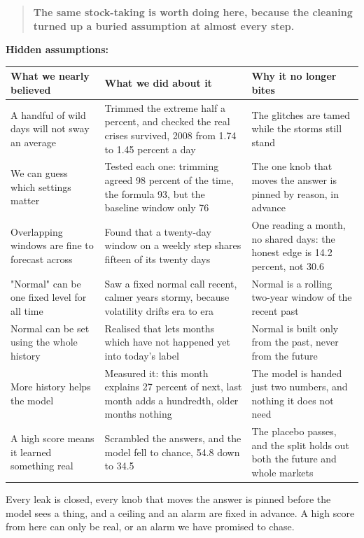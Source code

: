 \documentclass[11pt]{article} %
\begin{document}
\begin{quote}
\textbf{The same stock-taking is worth doing here, because the cleaning turned up a buried assumption at almost every step.}
\end{quote}


\textbf{Hidden assumptions:}

\begin{center}
\begin{tabular}{lll}
\hline
What we nearly believed & What we did about it & Why it no longer bites \\
\hline
A handful of wild days will not sway an average & Trimmed the extreme half a percent, and checked the real crises survived, 2008 from 1.74 to 1.45 percent a day & The glitches are tamed while the storms still stand \\
We can guess which settings matter & Tested each one: trimming agreed 98 percent of the time, the formula 93, but the baseline window only 76 & The one knob that moves the answer is pinned by reason, in advance \\
Overlapping windows are fine to forecast across & Found that a twenty-day window on a weekly step shares fifteen of its twenty days & One reading a month, no shared days: the honest edge is 14.2 percent, not 30.6 \\
"Normal" can be one fixed level for all time & Saw a fixed normal call recent, calmer years stormy, because volatility drifts era to era & Normal is a rolling two-year window of the recent past \\
Normal can be set using the whole history & Realised that lets months which have not happened yet into today's label & Normal is built only from the past, never from the future \\
More history helps the model & Measured it: this month explains 27 percent of next, last month adds a hundredth, older months nothing & The model is handed just two numbers, and nothing it does not need \\
A high score means it learned something real & Scrambled the answers, and the model fell to chance, 54.8 down to 34.5 & The placebo passes, and the split holds out both the future and whole markets \\
\hline
\end{tabular}
\end{center}


Every leak is closed, every knob that moves the answer is pinned before the model sees a thing, and a ceiling and an alarm are fixed in advance. A high score from here can only be real, or an alarm we have promised to chase.
\end{document}
